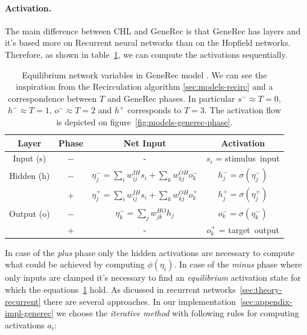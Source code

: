 \paragraph{Activation.} 
\label{sec:models-generec-activation} 
The main difference between CHL and GeneRec is that GeneRec has layers and it's based more on Recurrent neural networks than on the Hopfield networks. Therefore, as shown in table~\ref{tab:models-generec}, we can compute the activations sequentially. 
\begin{table}[H]
  \centering
  \begin{tabular}{|cccc|}
    \hline
    Layer & Phase & Net Input & Activation\\
    \hline
    Input (s)    & $-$ & - & $s_i$ = \mbox{stimulus input} \\
    \hline
    Hidden (h)   & $-$ & \hspace{0.3cm}$\eta^{-}_j = \sum_i w_{ij}^{IH}s_i + \sum_k w_{kj}^{OH}o^{-}_k$\hspace{0.3cm} &
    $h^{-}_j = \sigma(\eta^{-}_j)$\hspace{0.3cm}\\
          &  +  & $\eta^{+}_j = \sum_{i}w_{ij}^{IH}s_i + \sum_k w_{kj}^{OH}o^{+}_k$ & $h^{+}_{j} = \sigma(\eta^{+}_j)$ \\
    \hline
    Output (o) & $-$ & $\eta^{-}_k = \sum_j w_{jk}^{HO}h_j$ & $o^{-}_k = \sigma(\eta^{-}_k)$\\
           &  +  & - & $o^{+}_k$ = \mbox{target output} \\
    \hline
  \end{tabular}
  \caption{Equilibrium network variables in GeneRec model \citet{o1996bio}. We can see the inspiration from the Recirculation algorithm \ref{sec:models-recirc} and a correspondence between $T$ and GeneRec phases. In particular $s^{-} \approx T=0$, $h^{-} \approx T=1$, $o^{-} \approx T=2$ and $h^{+}$ corresponds to $T=3$. The activation flow is depicted on figure~\ref{fig:models-generec-phase}.}
  \label{tab:models-generec}
\end{table}
In case of the \emph{plus} phase only the hidden activations are necessary to compute what could be achieved by computing $\phi(\eta_i)$. In case of the \emph{minus} phase where only inputs are clamped it's necessary to find an \emph{equilibrium} activation state for which the equations~\ref{tab:models-generec} hold. As dicussed in recurrent networks~\ref{sec:theory-recurrent} there are several approaches. In our implementation~\ref{sec:appendix-impl-generec} we choose the \emph{iterative method} with following rules for computing activations $a_i$: 
